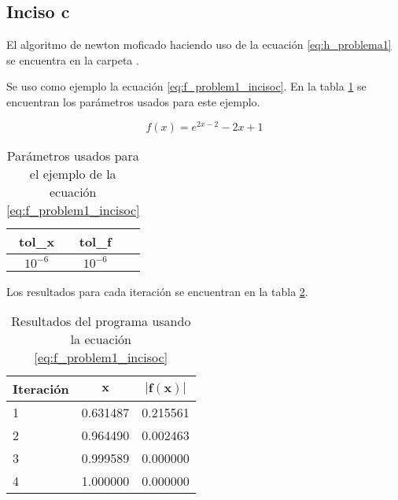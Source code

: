 \subsection*{Inciso c}

El algoritmo de newton moficado haciendo uso de la ecuación \ref{eq:h_problema1} se encuentra en la carpeta .

Se uso como ejemplo la ecuación \ref{eq:f_problem1_incisoc}. En la tabla  \ref{table:problem1_parameters} se encuentran los parámetros usados para este ejemplo.


\begin{equation}
    f(x) = e^{2x-2}-2x+1 \label{eq:f_problem1_incisoc}
\end{equation}

\begin{table}[H]
    \centering
    \begin{tabular}{ccc} \hline
        \textbf{tol\_x} & \textbf{tol\_f} \\   \hline
        $10^{-6}$       & $10^{-6}$       \\  \hline
    \end{tabular}
    \caption{Parámetros usados para el ejemplo de la ecuación \ref{eq:f_problem1_incisoc}}
    \label{table:problem1_parameters}
\end{table}

Los resultados para cada iteración se encuentran en la tabla \ref{table:problema1_results}.
\begin{table}[H]
    \centering
    \begin{tabular}{lcc} \hline
        \textbf{Iteración} & $\mathbf{x}$ & $\mathbf{|f(x)|}$ \\ \hline
        1                  & 0.631487     & 0.215561          \\
        2                  & 0.964490     & 0.002463          \\
        3                  & 0.999589     & 0.000000          \\
        4                  & 1.000000     & 0.000000          \\ \hline
    \end{tabular}
    \caption{Resultados del programa usando la ecuación \ref{eq:f_problem1_incisoc}}
    \label{table:problema1_results}
\end{table}

